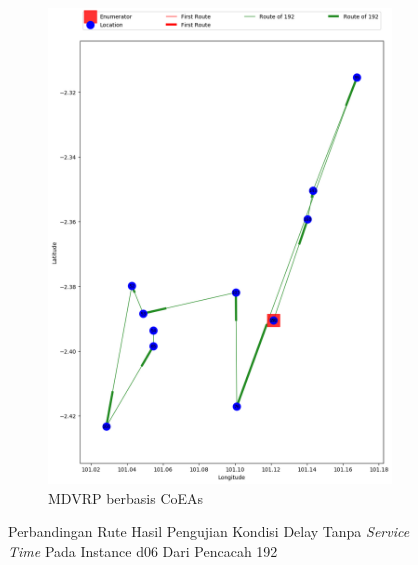 \begin{figure}[H]
	\centering
	\begin{subfigure}[t]{\textwidth}
		\centering
		\includegraphics[width=\textwidth]{Resources/Images/delayed_6/real_m15_n100_delayed_6_192_coes}
		\caption{MDVRP berbasis CoEAs}
		\label{fig:real_m15_n100_delayed_6_192_coes}
	\end{subfigure}
	\caption{Perbandingan Rute Hasil Pengujian Kondisi Delay Tanpa \textit{Service Time} Pada Instance d06 Dari Pencacah 192}
	\label{fig:real_m15_n100_delayed_6_192}
\end{figure}


